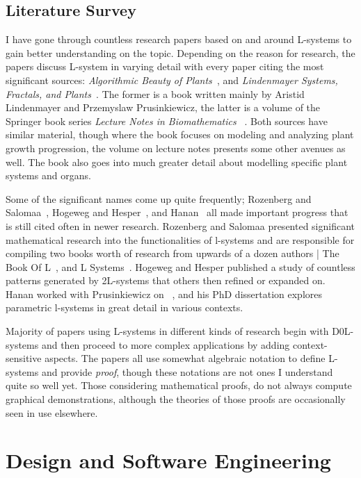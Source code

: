 \documentclass[]{final_report}
\begin{document}
\section{Literature Survey}

I have gone through countless research papers based on and around L-systems to gain better understanding on the topic. Depending on the reason for research, the papers discuss L-system in varying detail with every paper citing the most significant sources: \emph{Algorithmic Beauty of Plants~\cite{PRU:1990}}, and \emph{Lindenmayer Systems, Fractals, and Plants~\cite{HAN:1989}}. The former is a book written mainly by Aristid Lindenmayer and Przemyslaw Prusinkiewicz, the latter is a volume of the Springer book series \emph{Lecture Notes in Biomathematics~\cite{SPR}} . Both sources have similar material, though where the book focuses on modeling and analyzing plant growth progression, the volume on lecture notes presents some other avenues as well. The book also goes into much greater detail about modelling specific plant systems and organs.

Some of the significant names come up quite frequently; Rozenberg and Salomaa~\cite{ROZ:1974}, Hogeweg and Hesper~\cite{HOG:1974}, and Hanan~\cite{HAN:1992} all made important progress that is still cited often in newer research. Rozenberg and Salomaa presented significant mathematical research into the functionalities of l-systems and are responsible for compiling two books worth of research from upwards of a dozen authors | The Book Of L~\cite{ROZAA}, and L Systems~\cite{LILA}. Hogeweg and Hesper published a study of countless patterns generated by 2L-systems that others then refined or expanded on. Hanan worked with Prusinkiewicz on ~\cite{HAN:1989}, and his PhD dissertation explores parametric l-systems in great detail in various contexts.


Majority of papers using L-systems in different kinds of research begin with D0L-systems and then proceed to more complex applications by adding context-sensitive aspects. The papers all use somewhat algebraic notation to define L-systems and provide \emph{proof}, though these notations are not ones I understand quite so well yet. Those considering mathematical proofs, do not always compute graphical demonstrations, although the theories of those proofs are occasionally seen in use elsewhere. 


\chapter{Design and Software Engineering}
\end{document}
